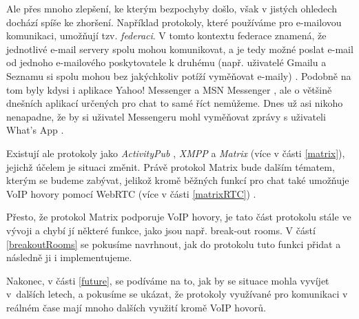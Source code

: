 Ale přes mnoho zlepšení, ke kterým bezpochyby došlo, však v jistých ohledech
dochází spíše ke zhoršení. Například protokoly, které používáme pro e-mailovou
komunikaci, umožňují tzv. \textit{federaci}. V tomto kontextu federace znamená,
že jednotlivé e-mail servery spolu mohou komunikovat, a je tedy možné poslat
e-mail od jednoho e-mailového poskytovatele k druhému (např. uživatelé Gmailu a
Seznamu si spolu mohou bez jakýchkoliv potíží vyměňovat e-maily)
\cite{MatrixORG-FAQ}. Podobně na tom byly kdysi i aplikace Yahoo! Messenger a
MSN Messenger \cite{BetaNews-MSYahooToLinkIMNets}, ale o většině dnešních
aplikací určených pro chat to samé říct nemůžeme. Dnes už asi nikoho nenapadne,
že by si uživatel Messengeru mohl vyměňovat zprávy s uživateli What's App
\cite{9To5Mac-InteroperabilityNightmareAndDream}.

Existují ale protokoly jako \textit{ActivityPub} \cite{W3ORG-ActivityPub},
\textit{XMPP} \cite{XMPPORG-Homepage} a \textit{Matrix}
\cite{MatrixORG-Homepage} (více v části \ref{matrix}), jejichž účelem je situaci
změnit. Právě protokol Matrix bude dalším tématem, kterým se budeme zabývat,
jelikož kromě běžných funkcí pro chat také umožňuje VoIP hovory pomocí WebRTC
(více v části \ref{matrixRTC}) \cite{MatrixORG-Homepage,MatrixORG-Spec}.

Přesto, že protokol Matrix podporuje VoIP hovory, je tato část protokolu stále
ve vývoji \cite{GitHub-MSC3401,GitHub-MSC3898} a chybí jí některé funkce, jako
jsou např. break-out rooms. V částí \ref{breakoutRooms} se pokusíme navrhnout,
jak do protokolu tuto funkci přidat a následně ji i implementujeme.

Nakonec, v části \ref{future}, se podíváme na to, jak by se situace mohla
vyvíjet v~dalších letech, a pokusíme se ukázat, že protokoly využívané pro
komunikaci v reálném čase mají mnoho dalších využití kromě VoIP hovorů.
